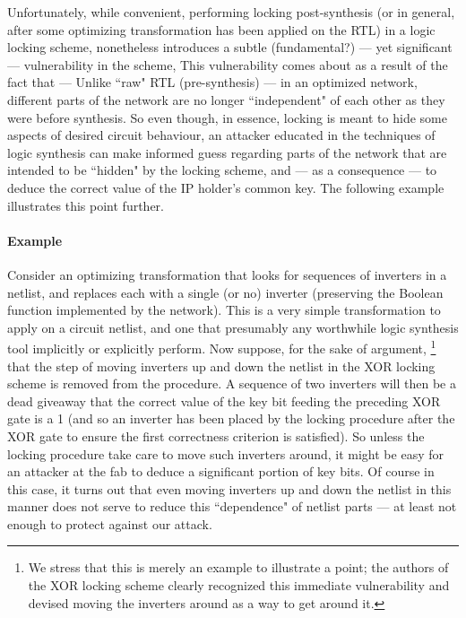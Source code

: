 
Unfortunately, while convenient, performing locking post-synthesis (or in general, after some optimizing transformation has been applied on the RTL) in a logic locking scheme, nonetheless introduces a subtle (fundamental?) --- yet significant --- vulnerability in the scheme, %
This vulnerability comes about as a result of the fact that --- Unlike ``raw" RTL (pre-synthesis) --- in an optimized network, different parts of the network are no longer ``independent" of each other as they were before synthesis. So even though, in essence, locking is meant to hide some aspects of desired circuit behaviour, an attacker educated in the techniques of logic synthesis
can make informed guess regarding parts of the network that are intended to be ``hidden" by the locking scheme, and --- as a consequence --- to deduce the correct value of the IP holder's common key. The following example illustrates this point further.

\paragraph{Example} Consider an optimizing transformation that looks for sequences of inverters in a netlist, and replaces each with a single (or no) inverter (preserving the Boolean function implemented by the network). This is a very simple transformation to apply on a circuit netlist, and one that presumably any worthwhile logic synthesis tool implicitly or explicitly perform. Now suppose, for the sake of argument, \footnote{We stress that this is merely an example to illustrate a point; the authors of the XOR locking scheme clearly recognized this immediate vulnerability and devised moving the inverters around as a way to get around it.
} that the step of moving inverters up and down the netlist in the XOR locking scheme is removed from the procedure. A sequence of two inverters will then be a dead giveaway that the correct value of the key bit feeding the preceding XOR gate is a 1 (and so an inverter has been placed by the locking procedure after the XOR gate to ensure the first correctness criterion is satisfied). So unless the locking procedure take care to move such inverters around, it might be easy for an attacker at the fab to deduce a significant portion of key bits. Of course in this case, it turns out that even moving inverters up and down the netlist in this manner does not serve to reduce this ``dependence" of netlist parts --- at least not enough to protect against our attack.

